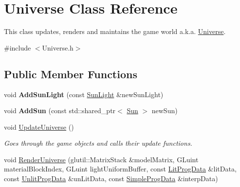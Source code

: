 \hypertarget{class_universe}{\section{Universe Class Reference}
\label{class_universe}
}


This class updates, renders and maintains the game world a.\-k.\-a. \hyperlink{class_universe}{Universe}.  




{\ttfamily \#include $<$Universe.\-h$>$}

\subsection*{Public Member Functions}
\begin{DoxyCompactItemize}
\item 
\hypertarget{class_universe_a37bff5a776da7a803b5548f4376eba00}{void {\bfseries Add\-Sun\-Light} (const \hyperlink{class_sun_light}{Sun\-Light} \&new\-Sun\-Light)}\label{class_universe_a37bff5a776da7a803b5548f4376eba00}

\item 
\hypertarget{class_universe_a60a3909961a95ae35158c63f84ca0182}{void {\bfseries Add\-Sun} (const std\-::shared\-\_\-ptr$<$ \hyperlink{class_sun}{Sun} $>$ new\-Sun)}\label{class_universe_a60a3909961a95ae35158c63f84ca0182}

\item 
\hypertarget{class_universe_acae0ef79d1350457b3824a19134f8a3d}{void \hyperlink{class_universe_acae0ef79d1350457b3824a19134f8a3d}{Update\-Universe} ()}\label{class_universe_acae0ef79d1350457b3824a19134f8a3d}

\begin{DoxyCompactList}\small\item\em Goes through the game objects and calls their update functions. \end{DoxyCompactList}\item 
\hypertarget{class_universe_a9293cf3a90d969d42ba68f17534603a4}{void \hyperlink{class_universe_a9293cf3a90d969d42ba68f17534603a4}{Render\-Universe} (glutil\-::\-Matrix\-Stack \&model\-Matrix, G\-Luint material\-Block\-Index, G\-Luint light\-Uniform\-Buffer, const \hyperlink{struct_lit_prog_data}{Lit\-Prog\-Data} \&lit\-Data, const \hyperlink{struct_unlit_prog_data}{Unlit\-Prog\-Data} \&un\-Lit\-Data, const \hyperlink{struct_simple_prog_data}{Simple\-Prog\-Data} \&interp\-Data)}\label{class_universe_a9293cf3a90d969d42ba68f17534603a4}


\end{DoxyCompactItemize}
